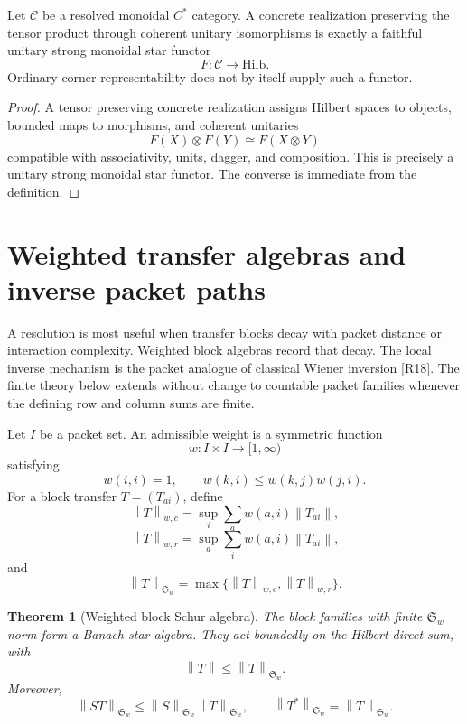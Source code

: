 \documentclass{aomart}
\newtheorem{theorem}{Theorem}[section]
\theoremstyle{definition}
\theoremstyle{remark}
\newcommand{\Ccal}{\mathcal C}
\newcommand{\norm}[1]{\left\lVert#1\right\rVert}
\newcommand{\Rcite}[1]{\textup{[#1]}}
\begin{document}
\begin{proposition}\label{prop:monoidal_boundary}
Let \(\Ccal\) be a resolved monoidal \(C^*\) category. A concrete realization preserving the tensor product through coherent unitary isomorphisms is exactly a faithful unitary strong monoidal star functor
\[
 F:\Ccal\longrightarrow\mathrm{Hilb}.
\]
Ordinary corner representability does not by itself supply such a functor.
\end{proposition}

\begin{proof}
A tensor preserving concrete realization assigns Hilbert spaces to objects, bounded maps to morphisms, and coherent unitaries
\[
 F(X)\otimes F(Y)\cong F(X\otimes Y)
\]
compatible with associativity, units, dagger, and composition. This is precisely a unitary strong monoidal star functor. The converse is immediate from the definition.
\end{proof}

\section{Weighted transfer algebras and inverse packet paths}\label{sec:weighted_inverse}

A resolution is most useful when transfer blocks decay with packet distance or interaction complexity. Weighted block algebras record that decay. The local inverse mechanism is the packet analogue of classical Wiener inversion \Rcite{R18}. The finite theory below extends without change to countable packet families whenever the defining row and column sums are finite.

\begin{definition}\label{def:admissible_weight}
Let \(I\) be a packet set. An admissible weight is a symmetric function
\[
 w:I\times I\longrightarrow[1,\infty)
\]
satisfying
\[
 w(i,i)=1,
 \qquad
 w(k,i)\leq w(k,j)w(j,i).
\]
For a block transfer \(T=(T_{ai})\), define
\[
 \norm T_{w,c}
 =
 \sup_i\sum_a w(a,i)\norm{T_{ai}},
\]
\[
 \norm T_{w,r}
 =
 \sup_a\sum_i w(a,i)\norm{T_{ai}},
\]
and
\[
 \norm T_{\mathfrak S_w}
 =
 \max\{\norm T_{w,c},\norm T_{w,r}\}.
\]
\end{definition}

\begin{theorem}[Weighted block Schur algebra]\label{thm:weighted_schur_algebra}
The block families with finite \(\mathfrak S_w\) norm form a Banach star algebra. They act boundedly on the Hilbert direct sum, with
\[
 \boxed{
 \norm T\leq\norm T_{\mathfrak S_w}.
 }
\]
Moreover,
\[
 \boxed{
 \norm{ST}_{\mathfrak S_w}
 \leq
 \norm S_{\mathfrak S_w}\norm T_{\mathfrak S_w},
 \qquad
 \norm{T^*}_{\mathfrak S_w}=\norm T_{\mathfrak S_w}.
 }
\]
\end{theorem}
\end{document}
